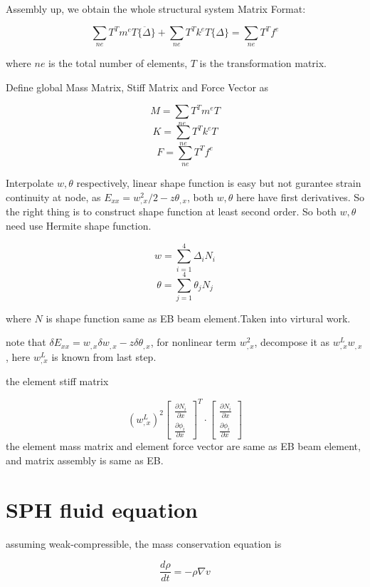\documentclass[11pt]{article}
\begin{document}
\begin{enumerate}
Assembly up, we obtain the whole structural system Matrix Format:

$$ \sum_{ne} T^T m^e T \{ \ddot{\Delta} \} + \sum_{ne} T^T k^e T \{ \Delta \} = \sum_{ne} T^T f^e $$ 

where $ne$ is the total number of elements, $T$ is the transformation matrix.

Define global Mass Matrix, Stiff Matrix and Force Vector as

$$ M = \sum_{ne} T^T m^e T $$
$$ K = \sum_{ne} T^T k^e T $$
$$ F = \sum_{ne} T^T f^e $$ 


Interpolate $w, \theta$ respectively, linear shape function is easy but not gurantee strain continuity at node, as $E_{xx} = w_{,x}^2/2 - z \theta_{,x} $, both $w, \theta$ here have first derivatives. So the right thing is to construct shape function at least second order. So both $w, \theta$ need use Hermite shape function.
  
$$ w = \sum_{i=1}^4 \Delta_i N_i $$
$$ \theta = \sum_{j=1}^4 \theta_j N_j $$

where $N$ is shape function same as EB beam element.Taken into virtural work.

note that $ \delta E_{xx} = w_{,x} \delta w_{,x} - z \delta \theta_{,x} $, for nonlinear term $ w_{,x}^2$, decompose it as $w_{,x}^L w_{,x}$, here $w_{,x}^L$ is known from last step.

the element stiff matrix  

$$
(w_{,x}^L)^2 \begin{bmatrix} \frac{\partial N_i}{\partial x} \\ \frac{\partial \phi_i}{\partial x} \end{bmatrix} ^T \cdot \begin{bmatrix} \frac{\partial N_i}{\partial x} \\ \frac{\partial \phi_i}{\partial x} \end{bmatrix}
$$
the element mass matrix and element force vector are same as EB beam element, and matrix assembly is same as EB. 
   
\end{enumerate}

\section{SPH fluid equation}

assuming weak-compressible, the mass conservation equation is

$$ \frac{d \rho}{dt} = - \rho \nabla  v $$
\end{document}
